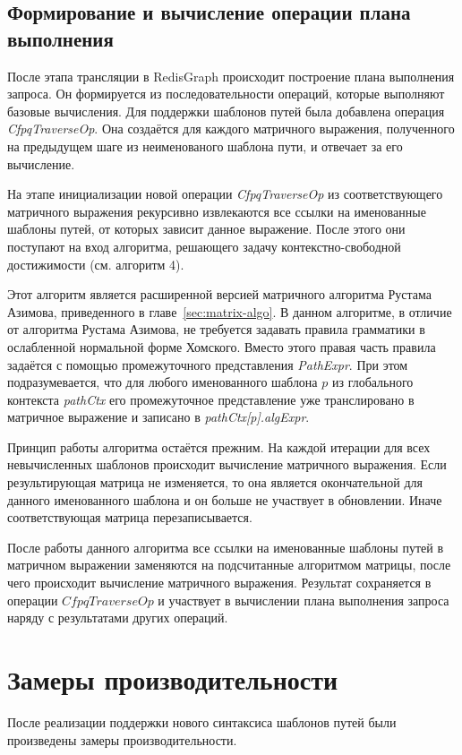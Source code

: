 \documentclass[14pt]{matmex-diploma-custom}
\begin{document}
\subsection{Формирование и вычисление операции плана выполнения}
После этапа трансляции в RedisGraph происходит построение плана выполнения запроса. Он формируется из последовательности операций, которые выполняют базовые вычисления. Для поддержки шаблонов путей была добавлена операция \textit{CfpqTraverseOp}. Она создаётся для каждого матричного выражения, полученного на предыдущем шаге из неименованого шаблона пути, и отвечает за его вычисление.

На этапе инициализации новой операции \textit{CfpqTraverseOp} из соответствующего матричного выражения рекурсивно извлекаются все ссылки на именованные шаблоны путей, от которых зависит данное выражение. После этого они поступают на вход алгоритма, решающего задачу контекстно-свободной достижимости (см. алгоритм 4).

Этот алгоритм является расширенной версией матричного алгоритма Рустама Азимова, приведенного в главе~\ref{sec:matrix-algo}. В данном алгоритме, в отличие от алгоритма Рустама Азимова, не требуется задавать правила грамматики в ослабленной нормальной форме Хомского. Вместо этого правая часть правила задаётся с помощью промежуточного представления \textit{PathExpr}. При этом подразумевается, что для любого именованного шаблона $p$ из глобального контекста \textit{pathCtx} его промежуточное представление уже транслировано в матричное выражение и записано в \textit{pathCtx[p].algExpr}.

Принцип работы алгоритма остаётся прежним. На каждой итерации для всех невычисленных шаблонов происходит вычисление матричного выражения. Если результирующая матрица не изменяется, то она является окончательной для данного именованного шаблона и он больше не участвует в обновлении. Иначе соответствующая матрица перезаписывается.

После работы данного алгоритма все ссылки на именованные шаблоны путей в матричном выражении заменяются на подсчитанные алгоритмом матрицы, после чего происходит вычисление матричного выражения. Результат сохраняется в операции $CfpqTraverseOp$ и участвует в вычислении плана выполнения запроса наряду с результатами других операций. 


\section{Замеры производительности}
После реализации поддержки нового синтаксиса шаблонов путей были произведены замеры производительности.
\end{document}
